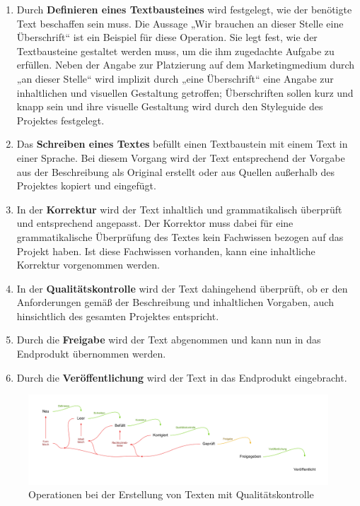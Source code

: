 \documentclass[11pt,a4paper]{article}
\begin{document}
\begin{enumerate}
\item{Durch \textbf{Definieren eines Textbausteines} wird festgelegt, wie der benötigte Text beschaffen sein muss. Die Aussage „Wir brauchen an dieser Stelle eine Überschrift“ ist ein Beispiel für diese Operation. Sie legt fest, wie der Textbausteine gestaltet werden muss, um die ihm zugedachte Aufgabe zu erfüllen. Neben der Angabe zur Platzierung auf dem Marketingmedium durch „an dieser Stelle“ wird implizit durch „eine Überschrift“ eine Angabe zur inhaltlichen und visuellen Gestaltung getroffen; Überschriften sollen kurz und knapp sein und ihre visuelle Gestaltung wird durch den Styleguide des Projektes festgelegt.}
\item{Das \textbf{Schreiben eines Textes} befüllt einen Textbaustein mit einem Text in einer Sprache. Bei diesem Vorgang wird der Text entsprechend der Vorgabe aus der Beschreibung als Original erstellt oder aus Quellen außerhalb des Projektes kopiert und eingefügt. }
\item{In der \textbf{Korrektur} wird der Text inhaltlich und grammatikalisch überprüft und entsprechend angepasst. Der Korrektor muss dabei für eine grammatikalische Überprüfung des Textes kein Fachwissen bezogen auf das Projekt haben. Ist diese Fachwissen vorhanden, kann eine inhaltliche Korrektur vorgenommen werden.}
\item{In der \textbf{Qualitätskontrolle} wird der Text dahingehend überprüft, ob er den Anforderungen gemäß der Beschreibung und inhaltlichen Vorgaben, auch hinsichtlich des gesamten Projektes entspricht. }
\item{Durch die \textbf{Freigabe} wird der Text abgenommen und kann nun in das Endprodukt übernommen werden.}
\item{Durch die \textbf{Veröffentlichung} wird der Text in das Endprodukt eingebracht.}
\end{enumerate}

\begin{figure}[htb]
\begin{center}
\includegraphics[width=\textwidth]{media/chart-4.pdf}
\end{center}
\caption{Operationen bei der Erstellung von Texten mit Qualitätskontrolle}
\label{chart:4}
\end{figure}
\end{document}
